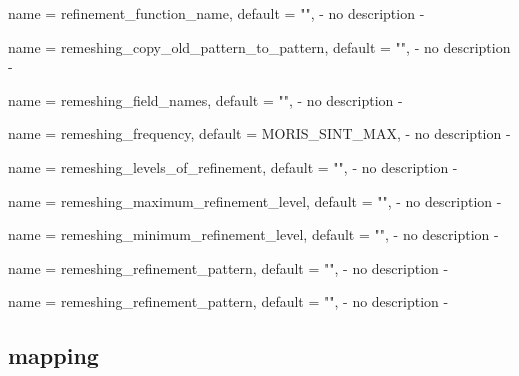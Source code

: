 \begin{parameter}{
    name    = {refinement_function_name},
    default = {""},
}
- no description -
\end{parameter}

\begin{parameter}{
    name    = {remeshing_copy_old_pattern_to_pattern},
    default = {""},
}
- no description -
\end{parameter}

\begin{parameter}{
    name    = {remeshing_field_names},
    default = {""},
}
- no description -
\end{parameter}

\begin{parameter}{
    name    = {remeshing_frequency},
    default = {MORIS_SINT_MAX},
}
- no description -
\end{parameter}

\begin{parameter}{
    name    = {remeshing_levels_of_refinement},
    default = {""},
}
- no description -
\end{parameter}

\begin{parameter}{
    name    = {remeshing_maximum_refinement_level},
    default = {""},
}
- no description -
\end{parameter}

\begin{parameter}{
    name    = {remeshing_minimum_refinement_level},
    default = {""},
}
- no description -
\end{parameter}

\begin{parameter}{
    name    = {remeshing_refinement_pattern},
    default = {""},
}
- no description -
\end{parameter}

\begin{parameter}{
    name    = {remeshing_refinement_pattern},
    default = {""},
}
- no description -
\end{parameter}

\subsection{mapping}

